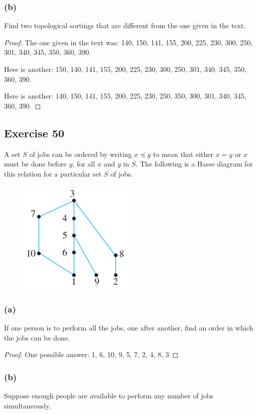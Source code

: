 \documentclass[14pt]{extarticle}
\begin{document}
\subsubsection{(b)}
Find two topological sortings that are different from the one given in the text.

\begin{proof}
The one given in the text was: 140, 150, 141, 155, 200, 225, 230, 300, 250, 301, 340, 345, 350, 360, 390.

Here is another: 150, 140, 141, 155, 200, 225, 230, 300, 250, 301, 340, 345, 350, 360, 390.

Here is another: 140, 150, 141, 155, 200, 225, 230, 250, 350, 300, 301, 340, 345, 360, 390.
\end{proof}

\subsection{Exercise 50}
A set $S$ of jobs can be ordered by writing \(x \preceq y\) to mean that either \(x = y\) or \(x\) must be done before 
\(y\), for all \(x\) and \(y\) in \(S\). The following is a Hasse diagram for this relation for a particular set \(S\) 
of jobs.

\begin{figure}[ht!]
\centering
\includegraphics[scale=0.5]{../images/8.5.50.png}
\end{figure}

\subsubsection{(a)}
If one person is to perform all the jobs, one after another, find an order in which the jobs can be done.

\begin{proof}
One possible answer: 1, 6, 10, 9, 5, 7, 2, 4, 8, 3
\end{proof}

\subsubsection{(b)}
Suppose enough people are available to perform any number of jobs simultaneously.
\end{document}
